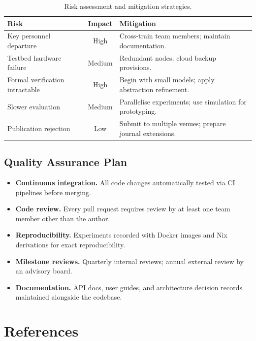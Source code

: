 \documentclass[
    language=english,
    doctype=grant-proposal,
    institution=none,
]{../../omnilatex}
\begin{document}
\begin{table}[htbp]
    \centering
    \caption{Risk assessment and mitigation strategies.}
    \label{tab:risks}
    \begin{tabular}{@{}p{3.5cm}cp{6cm}@{}}
        \toprule
        \textbf{Risk} & \textbf{Impact} & \textbf{Mitigation} \\
        \midrule
        Key personnel departure & High
            & Cross-train team members; maintain documentation. \\
        Testbed hardware failure & Medium
            & Redundant nodes; cloud backup provisions. \\
        Formal verification intractable & High
            & Begin with small models; apply abstraction refinement. \\
        Slower evaluation & Medium
            & Parallelise experiments; use simulation for prototyping. \\
        Publication rejection & Low
            & Submit to multiple venues; prepare journal extensions. \\
        \bottomrule
    \end{tabular}
\end{table}

\subsection{Quality Assurance Plan}
\begin{itemize}
    \item \textbf{Continuous integration.} All code changes automatically
          tested via CI pipelines before merging.
    \item \textbf{Code review.} Every pull request requires review by
          at least one team member other than the author.
    \item \textbf{Reproducibility.} Experiments recorded with Docker
          images and Nix derivations for exact reproducibility.
    \item \textbf{Milestone reviews.} Quarterly internal reviews;
          annual external review by an advisory board.
    \item \textbf{Documentation.} API docs, user guides, and architecture
          decision records maintained alongside the codebase.
\end{itemize}

\newpage

\section*{References}
\printbibliography[heading=none]
\end{document}
